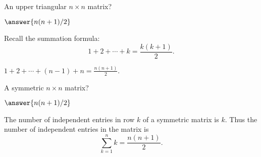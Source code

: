 \documentclass{ximera}
\begin{document}
\begin{exercise}  \label{c1.3.3b}
  An upper triangular $n\times n$ matrix? \begin{prompt}$\answer{n(n+1)/2}$\end{prompt}
  \begin{hint}Recall the
    summation formula:
    \[
      1 + 2 + \cdots + k = \frac{k(k+1)}{2}.
    \]
  \end{hint}

\begin{solution}
$1 + 2 + \cdots + (n-1) + n = \frac{n(n + 1)}{2}$.

\end{solution}
\end{exercise}
\begin{exercise}  \label{c1.3.3c}
A symmetric $n\times n$ matrix?   
\begin{prompt}$\answer{n(n+1)/2}$\end{prompt}

\begin{solution}
The number of independent entries in row $k$ of a symmetric matrix is $k$.  Thus the number of independent entries in the matrix is 
\[
\sum_{k=1}^n k = \frac{n(n + 1)}{2}.
\]
\end{solution}
\end{exercise}
\end{document}
